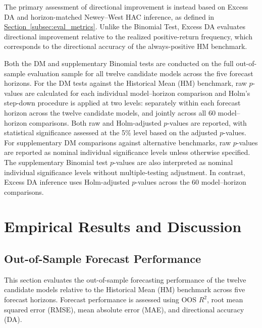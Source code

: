 \documentclass[runningheads,orivec]{llncs}
\begin{document}
The primary assessment of directional improvement is instead based on Excess DA and horizon-matched Newey--West HAC inference, as defined in \hyperref[subsec:eval_metrics]{Section~\ref*{subsec:eval_metrics}}. Unlike the Binomial Test, Excess DA evaluates directional improvement relative to the realized positive-return frequency, which corresponds to the directional accuracy of the always-positive HM benchmark.

Both the DM and supplementary Binomial tests are conducted on the full out-of-sample evaluation sample for all twelve candidate models across the five forecast horizons. For the DM tests against the Historical Mean (HM) benchmark, raw $p$-values are calculated for each individual model--horizon comparison and Holm's step-down procedure is applied at two levels: separately within each forecast horizon across the twelve candidate models, and jointly across all 60 model--horizon comparisons. Both raw and Holm-adjusted $p$-values are reported, with statistical significance assessed at the 5\% level based on the adjusted $p$-values. For supplementary DM comparisons against alternative benchmarks, raw $p$-values are reported as nominal individual significance levels unless otherwise specified. The supplementary Binomial test $p$-values are also interpreted as nominal individual significance levels without multiple-testing adjustment. In contrast, Excess DA inference uses Holm-adjusted $p$-values across the 60 model--horizon comparisons.

\section{Empirical Results and Discussion}\label{sec:results}

\subsection{Out-of-Sample Forecast Performance}\label{subsec:oos_performance}

This section evaluates the out-of-sample forecasting performance of the twelve candidate models relative to the Historical Mean (HM) benchmark across five forecast horizons. Forecast performance is assessed using OOS $R^2$, root mean squared error (RMSE), mean absolute error (MAE), and directional accuracy (DA).
\end{document}
